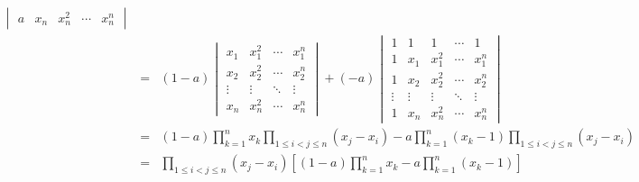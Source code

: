\begin{solution}
\begin{eqnarray*}
\begin{vmatrix}
			a      & x_{n}  & x_{n}^2 & \cdots & x_{n}^n
		\end{vmatrix}\\
		& = & (1-a)
		\begin{vmatrix}
			x_{1}  & x_{1}^2 & \cdots & x_{1}^n\\
			x_{2}  & x_{2}^2 & \cdots & x_{2}^n\\
			\vdots & \vdots  & \ddots & \vdots\\
			x_{n}  & x_{n}^2 & \cdots & x_{n}^n
		\end{vmatrix} +
		(-a)\begin{vmatrix}
			1      & 1      & 1       & \cdots & 1 \\
			1      & x_{1}  & x_{1}^2 & \cdots & x_{1}^n\\
			1      & x_{2}  & x_{2}^2 & \cdots & x_{2}^n\\
			\vdots & \vdots & \vdots  & \ddots & \vdots\\
			1      & x_{n}  & x_{n}^2 & \cdots & x_{n}^n
		\end{vmatrix}\\
		& = & (1-a)\prod\limits_{k=1}^{n}x_{k}\prod\limits_{1\leq i<j\leq n}(x_{j}-x_{i}) - 
		a\prod\limits_{k=1}^{n}(x_{k}-1)\prod\limits_{1\leq i<j\leq n}(x_{j}-x_{i})\\
		& = & \prod\limits_{1\leq i<j\leq n}(x_{j}-x_{i})\left[ (1-a)\prod\limits_{k=1}^{n}x_{k}-a\prod\limits_{k=1}^{n}(x_{k}-1)\right]
	\end{eqnarray*}
\end{solution}

